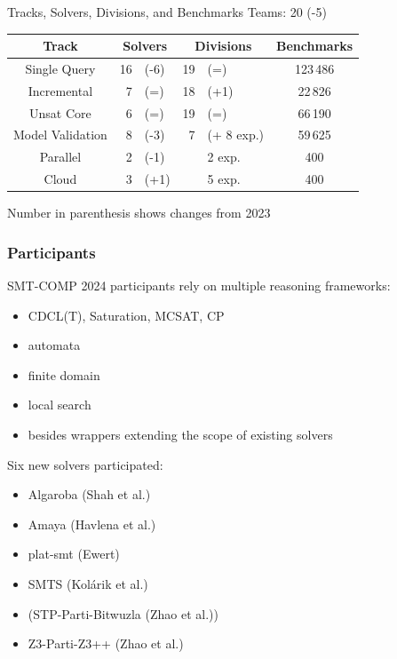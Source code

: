 \documentclass[table]{beamer}
\begin{document}
\begin{frame}{Tracks, Solvers, Divisions, and Benchmarks}
  Teams: 20 (-5) %
  \bigskip

    \begin{tabular}{c|r@{}l|r@{}l|c}
    Track & \multicolumn{2}{c|}{Solvers} & \multicolumn{2}{c|}{Divisions}  & Benchmarks \\
    \hline
    Single Query  &  16&(-6)  & 19&(=)  & 123\,486 \\ %
    Incremental &  7&(=)   & 18&(+1)  & 22\,826   \\ %
    Unsat Core  &  6&(=)   & 19&(=)  & 66\,190  \\ %
    Model Validation  &  8&(-3)    &  7& (+ 8 exp.)  & 59\,625  \\ %
    \hline
    Parallel &   2&(-1)      &   &2 exp.  & 400 \\
    Cloud & 3&(+1)      &  &5 exp.  & 400 \\

  \end{tabular}
  \bigskip

  Number in parenthesis shows changes from 2023
\end{frame}

\begin{frame}
  \frametitle{Participants}

  SMT-COMP 2024 participants rely on multiple reasoning frameworks:
  \begin{itemize}
  \item CDCL(T), Saturation, MCSAT, CP
  \item automata
  \item finite domain
  \item local search
  \item besides wrappers extending the scope of existing solvers
  \end{itemize}

  \bigskip
  Six new solvers participated:
  \begin{itemize}
\item Algaroba {\footnotesize (Shah et al.)}
\item Amaya {\footnotesize (Havlena et al.)}
\item plat-smt {\footnotesize (Ewert)}
\item SMTS {\footnotesize (Kol\'{a}rik et al.)}
\item (STP-Parti-Bitwuzla {\footnotesize (Zhao et al.)})
\item Z3-Parti-Z3++ {\footnotesize (Zhao et al.)}
\end{itemize}

\end{frame}
\end{document}

